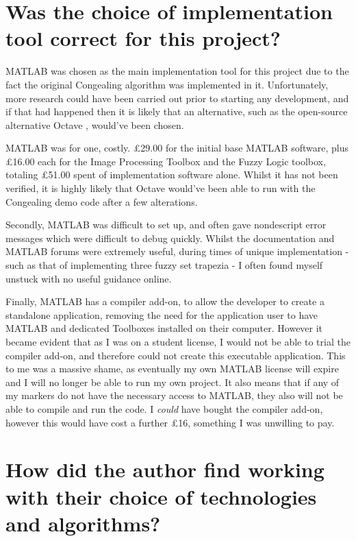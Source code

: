\section{Was the choice of implementation tool correct for this project?}

MATLAB was chosen as the main implementation tool for this project due to the fact the original \Gls{Congealing} algorithm was implemented in it. Unfortunately, more research could have been carried out prior to starting any development, and if that had happened then it is likely that an alternative, such as the open-source alternative Octave \cite{octave}, would've been chosen.

MATLAB was for one, costly. \pounds29.00 for the initial base MATLAB software, plus \pounds16.00 each for the Image Processing Toolbox and the Fuzzy Logic toolbox, totaling \pounds51.00 spent of implementation software alone. Whilst it has not been verified, it is highly likely that Octave would've been able to run with the \Gls{Congealing} demo code after a few alterations.

Secondly, MATLAB was difficult to set up, and often gave nondescript error messages which were difficult to debug quickly. Whilst the documentation and MATLAB forums were extremely useful, during times of unique implementation - such as that of implementing three fuzzy set trapezia - I often found myself unstuck with no useful guidance online.

Finally, MATLAB has a compiler add-on, to allow the developer to create a standalone application, removing the need for the application user to have MATLAB and dedicated Toolboxes installed on their computer. However it became evident that as I was on a student license, I would not be able to trial the compiler add-on, and therefore could not create this executable application. This to me was a massive shame, as eventually my own MATLAB license will expire and I will no longer be able to run my own project. It also means that if any of my markers do not have the necessary access to MATLAB, they also will not be able to compile and run the code. I \textit{could} have bought the compiler add-on, however this would have cost a further \pounds16, something I was unwilling to pay.

\section{How did the author find working with their choice of technologies and algorithms?}

